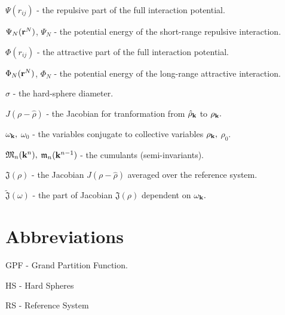 $\Psi(r_{ij})$ - the repulsive part of the full interaction potential.

$\Psi_N(\vb r^N)$, $\Psi_N$ - the potential energy of the short-range repulsive interaction.

$\Phi(r_{ij})$ - the attractive part of the full interaction potential. 

$\Phi_N(\vb r^N)$, $\Phi_N$ - the potential energy of the long-range attractive interaction.

$\sigma$ - the hard-sphere diameter. 

$J(\rho - \hat{\rho})$ - the Jacobian for tranformation from $\hat{\rho}_{\vb k}$ to $\rho_{\vb k}.$

$\omega_{\vb k},$ $\omega_0$ - the variables conjugate to collective variables $\rho_{\vb k},$ $\rho_0.$

$\mathfrak{M}_n(\vb k^n),$ $\mathfrak{m}_n(\vb k^{n-1})$ - the cumulants (semi-invariants).

$\mathfrak{J}(\rho)$ - the Jacobian $J(\rho - \hat{\rho})$ averaged over the reference system.

$\tilde{\mathfrak{J}}(\omega)$ - the part of Jacobian $\mathfrak{J}(\rho)$ dependent on $\omega_{\vb k}.$

\section*{Abbreviations}

GPF - Grand Partition Function.

HS - Hard Spheres

RS - Reference System